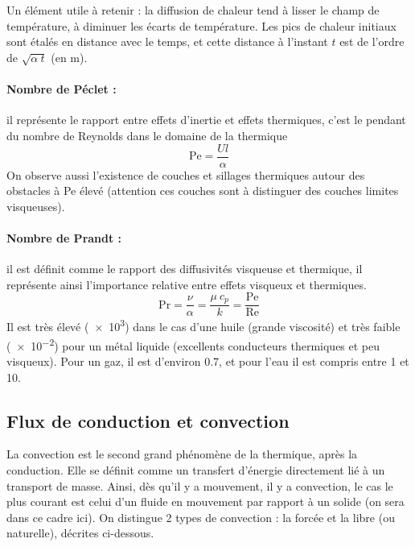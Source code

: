 Un élément utile à retenir : la diffusion de chaleur tend à lisser le champ de température, à diminuer les écarts de température. Les pics de chaleur initiaux sont étalés en distance avec le temps, et cette distance à l'instant $t$ est de l'ordre de $\sqrt{\alpha~t}$ (en m).


\paragraph{Nombre de Péclet :}il représente le rapport entre effets d'inertie et effets thermiques, c'est le pendant du nombre de Reynolds dans le domaine de la thermique
%
\begin{equation}
    \mathrm{Pe} = \frac{Ul}{\alpha}
\end{equation}
%
On observe aussi l'existence de couches et sillages thermiques autour des obstacles à Pe élevé (attention ces couches sont à distinguer des couches limites visqueuses).

\paragraph{Nombre de Prandt :}il est définit comme le rapport des diffusivités visqueuse et thermique, il représente ainsi l'importance relative entre effets visqueux et thermiques.
%
\begin{equation}
    \mathrm{Pr} = \frac{\nu}{\alpha}
       = \frac{\mu~c_p}{k}
       = \frac{\mathrm{Pe}}{\mathrm{Re}}
\end{equation}
%
Il est très élevé (\num{e3}) dans le cas d'une huile (grande viscosité) et très faible (\num{e-2}) pour un métal liquide (excellents conducteurs thermiques et peu visqueux). Pour un gaz, il est d'environ \num{0.7}, et pour l'eau il est compris entre \num{1} et \num{10}.

\subsection{Flux de conduction et convection}
La convection est le second grand phénomène de la thermique, après la conduction. Elle se définit comme un transfert d'énergie directement lié à un transport de masse. Ainsi, dès qu'il y a mouvement, il y a convection, le cas le plus courant est celui d'un fluide en mouvement par rapport à un solide (on sera dans ce cadre ici). On distingue 2 types de convection : la forcée et la libre (ou naturelle), décrites ci-dessous.

